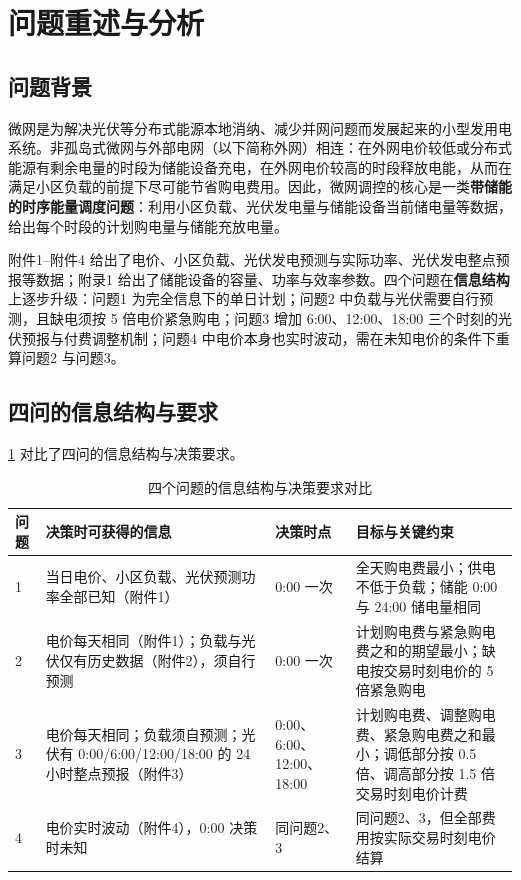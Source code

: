\section{问题重述与分析}
\label{sec:intro}

\subsection{问题背景}

微网是为解决光伏等分布式能源本地消纳、减少并网问题而发展起来的小型发用电系统。非孤岛式微网与外部电网（以下简称外网）相连：在外网电价较低或分布式能源有剩余电量的时段为储能设备充电，在外网电价较高的时段释放电能，从而在满足小区负载的前提下尽可能节省购电费用。因此，微网调控的核心是一类\textbf{带储能的时序能量调度问题}：利用小区负载、光伏发电量与储能设备当前储电量等数据，给出每个时段的计划购电量与储能充放电量。

附件1--附件4 给出了电价、小区负载、光伏发电预测与实际功率、光伏发电整点预报等数据；附录1 给出了储能设备的容量、功率与效率参数。四个问题在\textbf{信息结构}上逐步升级：问题1 为完全信息下的单日计划；问题2 中负载与光伏需要自行预测，且缺电须按 5 倍电价紧急购电；问题3 增加 6:00、12:00、18:00 三个时刻的光伏预报与付费调整机制；问题4 中电价本身也实时波动，需在未知电价的条件下重算问题2 与问题3。

\subsection{四问的信息结构与要求}

\cref{tab:problems} 对比了四问的信息结构与决策要求。

\begin{table}[H]
  \centering
  \caption{四个问题的信息结构与决策要求对比}
  \label{tab:problems}
  \small
  \begin{tabular}{p{1.4cm}p{4.0cm}p{3.4cm}p{5.4cm}}
    \toprule[1.5pt]
    问题 & 决策时可获得的信息 & 决策时点 & 目标与关键约束 \\
    \midrule[1pt]
    1 & 当日电价、小区负载、光伏预测功率全部已知（附件1） & 0:00 一次 & 全天购电费最小；供电不低于负载；储能 0:00 与 24:00 储电量相同 \\
    2 & 电价每天相同（附件1）；负载与光伏仅有历史数据（附件2），须自行预测 & 0:00 一次 & 计划购电费与紧急购电费之和的期望最小；缺电按交易时刻电价的 5 倍紧急购电 \\
    3 & 电价每天相同；负载须自预测；光伏有 0:00/6:00/12:00/18:00 的 24 小时整点预报（附件3） & 0:00、6:00、12:00、18:00 & 计划购电费、调整购电费、紧急购电费之和最小；调低部分按 0.5 倍、调高部分按 1.5 倍交易时刻电价计费 \\
    4 & 电价实时波动（附件4），0:00 决策时未知 & 同问题2、3 & 同问题2、3，但全部费用按实际交易时刻电价结算 \\
    \bottomrule[1.5pt]
  \end{tabular}
\end{table}

